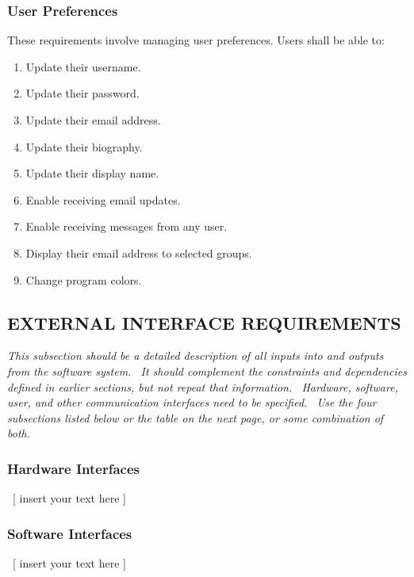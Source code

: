 \documentclass[twoside,letterpaper]{article}
\begin{document}
{\subsubsection{User Preferences}

These requirements involve managing user preferences. Users shall be able to:

\begin{enumerate}
	\item Update their username.
	\item Update their password.
	\item Update their email address.
	\item Update their biography.
	\item Update their display name.
	\item Enable receiving email updates.
	\item Enable receiving messages from any user.
	\item Display their email address to selected groups.
	\item Change program colors.
\end{enumerate}

}

\subsection[EXTERNAL INTERFACE REQUIREMENTS]{\rmfamily\bfseries\color{black} EXTERNAL INTERFACE
REQUIREMENTS}
\hypertarget{RefHeading20659017292}{}{\itshape\color{black}
This subsection should be a detailed description of all inputs into and outputs from the software system. \ It should
complement the constraints and dependencies defined in earlier sections, but not repeat that information. \ Hardware,
software, user, and other communication interfaces need to be specified. \ Use the four subsections listed below or the
table on the next page, or some combination of both.}

\subsubsection[Hardware Interfaces]{\rmfamily\bfseries\color{black} Hardware Interfaces}
\hypertarget{RefHeading20859017292}{}{\color{black}
\foreignlanguage{english}{\ [ insert your text here ]}}

\subsubsection[Software Interfaces]{\rmfamily\bfseries\color{black} Software Interfaces}
\hypertarget{RefHeading21059017292}{}{\color{black}
\foreignlanguage{english}{\ [ insert your text here ]}}
\end{document}
